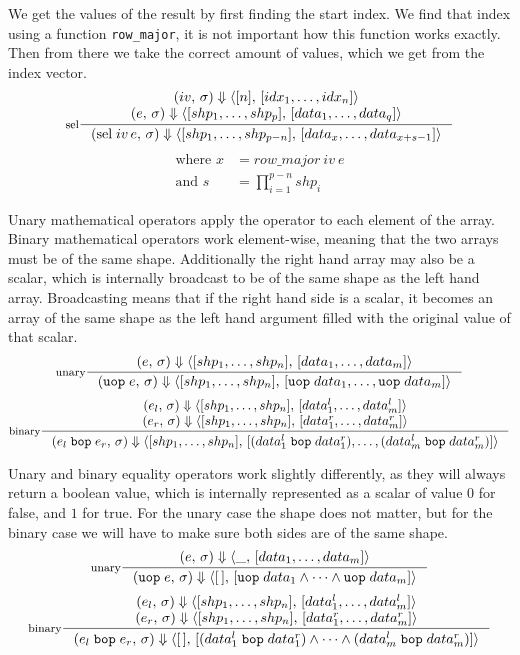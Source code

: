\documentclass[../main.tex]{subfiles}
\begin{document}
We get the values of the result by first finding the start index. We find that index using a function \texttt{row\_major}, it is not important how this function works exactly. Then from there we take the correct amount of values, which we get from the index vector.
\[
\inference[sel]{
    \sempair{iv} \Downarrow \valpair{[n]}{[idx_1, \dots, idx_n]} \\
    \sempair{e} \Downarrow \valpair{[shp_1, \dots, shp_p]}{[data_1, \dots, data_q]}
    }{
    \sempair{\selexpr{iv}{e}} \Downarrow \valpair{[shp_1, \dots, shp_{p-n}]}{[data_x, \dots, data_{x+s-1}]}
    }
\]
\vspace{-15pt}
\begin{align*}
    \text{where } x &= row\_major\ iv\ e \\
    \text{and } s &= \textstyle\prod_{i=1}^{p-n} shp_i
\end{align*}

Unary mathematical operators apply the operator to each element of the array.
Binary mathematical operators work element-wise, meaning that the two arrays must be of the same shape. Additionally the right hand array may also be a scalar, which is internally broadcast to be of the same shape as the left hand array. Broadcasting means that if the right hand side is a scalar, it becomes an array of the same shape as the left hand argument filled with the original value of that scalar.
\[
\inference[unary]{
    \sempair{e} \Downarrow \valpair{[shp_1, \dots, shp_n]}{[data_1, \dots, data_m]}
    }{
    \sempair{\uopexpr{e}} \Downarrow \valpair{[shp_1, \dots, shp_n]}{[\uopexpr{data_1}, \dots, \uopexpr{data_m}]}
    }
\]
\[
\inference[binary]{
    \sempair{e_l} \Downarrow \valpair{[shp_1, \dots, shp_n]}{[data_1^l, \dots, data_m^l]} \\
    \sempair{e_r} \Downarrow \valpair{[shp_1, \dots, shp_n]}{[data_1^r, \dots, data_m^r]}
    }{
    \sempair{\bopexpr{e_l}{e_r}} \Downarrow \valpair{[shp_1, \dots, shp_n]}{[(\bopexpr{data_1^l}{data_1^r}), \dots, (\bopexpr{data_m^l}{data_m^r})]}
    }
\]

Unary and binary equality operators work slightly differently, as they will always return a boolean value, which is internally represented as a scalar of value $0$ for false, and $1$ for true. For the unary case the shape does not matter, but for the binary case we will have to make sure both sides are of the same shape.
\[
\inference[unary]{
    \sempair{e} \Downarrow \valpair{\_}{[data_1, \dots, data_m]}
    }{
    \sempair{\uopexpr{e}} \Downarrow \valpair{[\,]}{[\uopexpr{data_1} \wedge \dots \wedge \uopexpr{data_m}]}
    }
\]
\[
\inference[binary]{
    \sempair{e_l} \Downarrow \valpair{[shp_1, \dots, shp_n]}{[data_1^l, \dots, data_m^l]} \\
    \sempair{e_r} \Downarrow \valpair{[shp_1, \dots, shp_n]}{[data_1^r, \dots, data_m^r]}
    }{
    \sempair{\bopexpr{e_l}{e_r}} \Downarrow \valpair{[\,]}{[(\bopexpr{data_1^l}{data_1^r}) \wedge \dots \wedge (\bopexpr{data_m^l}{data_m^r})]}
    }
\]
\end{document}
